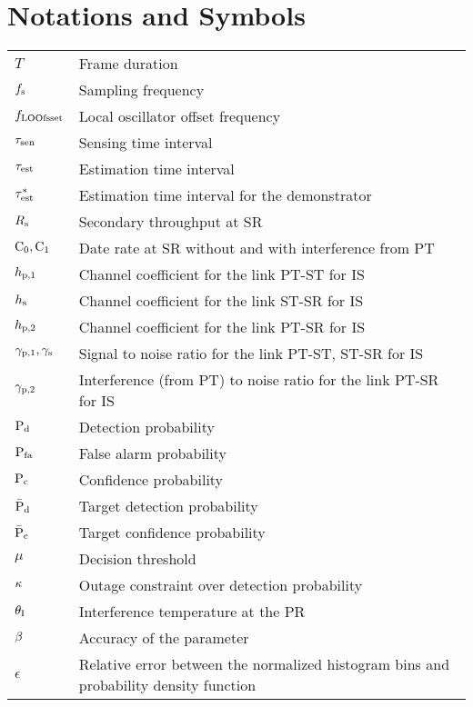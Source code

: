 
\chapter{Notations and Symbols}
\renewcommand{\arraystretch}{1.4}
\begin{longtable}{p{}p{}}

       $T$                     &       Frame duration \\
       $f_{\text{s}}$                 &       Sampling frequency \\
       $f_{\text{LOOfsset}}$                  &       Local oscillator offset frequency \\
       $\tau_{\text{sen}}$                 &       Sensing time interval \\
       $\tau_{\text{est}}$                 &       Estimation time interval \\      
       ${\tau}^*_{\text{est}}$               &       Estimation time interval for the demonstrator \\      
       $R_{\text{s}}$                   &       Secondary throughput at SR \\
       $\text{C}_{\text{0}},\text{C}_{\text{1}}$               &       Date rate at SR without and with interference from PT  \\
      
       $h_{\text{p,1}}$                  &       Channel coefficient for the link PT-ST for IS \\
       $h_{\text{s}}$                   &       Channel coefficient for the link ST-SR for IS \\
       $h_{\text{p,2}}$                  &       Channel coefficient for the link PT-SR for IS \\
       ${\gamma}_{\text{p,1}}, {\gamma}_{\text{s}}$      &       Signal to noise ratio for the link PT-ST, ST-SR for IS \\
       ${\gamma}_{\text{p,2}}$                &       Interference (from PT) to noise ratio for the link PT-SR for IS \\

       $\text{P}_{\text{d}}$                   &       Detection probability \\ 
       $\text{P}_{\text{fa}}$                  &       False alarm probability \\ 
       $\text{P}_{\text{c}}$                  &       Confidence probability \\ 
       $\bar{\text{P}}_{\text{d}}$                  &       Target detection probability \\ 
       $\bar{\text{P}}_{\text{c}}$                 &       Target confidence probability \\ 
       $\mu$                   &       Decision threshold \\ 
       $\kappa$                  &       Outage constraint over detection probability \\ 
       $\theta_{\text{I}}$                  &       Interference temperature at the PR \\ 
       $\beta$	               &       Accuracy of the parameter \\	
       $\epsilon$	       &       Relative error between the normalized histogram bins and probability density function  \\	


\end{longtable}

